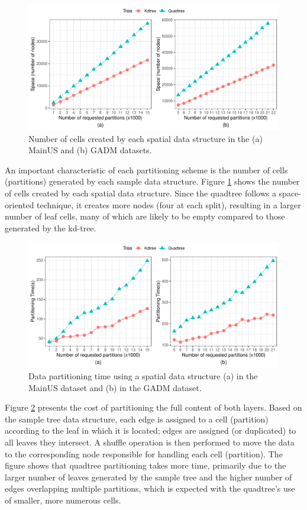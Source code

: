  \begin{figure}
    \centering
    \includegraphics[width=\textwidth]{chapterExtension/K/K_Space} 
    \caption{Number of cells created by each spatial data structure in the (a) MainUS and (b) GADM datasets.} \label{fig:k_space_us}
 \end{figure}

 An important characteristic of each partitioning scheme is the number of cells (partitions) generated by each sample data structure. Figure \ref{fig:k_space_us} shows the number of cells created by each spatial data structure. Since the quadtree follows a space-oriented technique, it creates more nodes (four at each split), resulting in a larger number of leaf cells, many of which are likely to be empty compared to those generated by the kd-tree.

 \begin{figure}
    \centering
    \includegraphics[width=\textwidth]{chapterExtension/K/K_Partitioning} 
    \caption{Data partitioning time using a spatial data structure (a) in the MainUS dataset and (b) in the GADM dataset.} \label{fig:k_partitioning_us}
 \end{figure}

 Figure \ref{fig:k_partitioning_us} presents the cost of partitioning the full content of both layers. Based on the sample tree data structure, each edge is assigned to a cell (partition) according to the leaf in which it is located; edges are assigned (or duplicated) to all leaves they intersect. A shuffle operation is then performed to move the data to the corresponding node responsible for handling each cell (partition). The figure shows that quadtree partitioning takes more time, primarily due to the larger number of leaves generated by the sample tree and the higher number of edges overlapping multiple partitions, which is expected with the quadtree’s use of smaller, more numerous cells.

